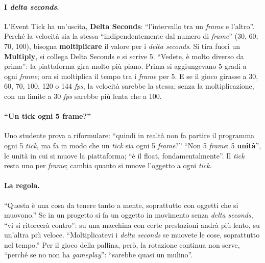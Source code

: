 \paragraph{I \emph{delta seconds}.} L'Event Tick ha un'uscita, \textbf{Delta Seconds}:
``l'intervallo tra un \emph{frame} e l'altro''. Perché la velocità sia la stessa
``indipendentemente dal numero di \emph{frame}'' (30, 60, 70, 100), bisogna
\textbf{moltiplicare} il valore per i \emph{delta seconds}. Si tira fuori un
\textbf{Multiply}, si collega Delta Seconds e si scrive 5. ``Vedete, è molto diverso da
prima'': la piattaforma gira molto più piano. Prima si aggiungevano 5 gradi a ogni
\emph{frame}; ora si moltiplica il tempo tra i \emph{frame} per 5. E se il gioco
girasse a 30, 60, 70, 100, 120 o 144 \emph{fps}, la velocità sarebbe la stessa; senza la
moltiplicazione, con un limite a 30 \emph{fps} sarebbe più lenta che a 100.

\paragraph{``Un tick ogni 5 frame?''} Uno studente prova a riformulare: ``quindi in realtà
non fa partire il programma ogni 5 \emph{tick}, ma fa in modo che un \emph{tick} sia ogni
5 \emph{frame}?'' ``Non 5 \emph{frame}: 5 \textbf{unità}'', le unità in cui si muove la
piattaforma; ``è il float, fondamentalmente''. Il \emph{tick} resta uno per
\emph{frame}; cambia quanto si muove l'oggetto a ogni \emph{tick}.

\paragraph{La regola.} ``Questa è una cosa da tenere tanto a mente, soprattutto con
oggetti che si muovono.'' Se in un progetto si fa un oggetto in movimento senza
\emph{delta seconds}, ``vi si ritorcerà contro'': su una macchina con certe prestazioni
andrà più lento, su un'altra più veloce. ``Moltiplicatevi i \emph{delta seconds} se
muovete le cose, soprattutto nel tempo.'' Per il gioco della pallina, però, la rotazione
continua non serve, ``perché se no non ha \emph{gameplay}'': ``sarebbe quasi un
mulino''.

